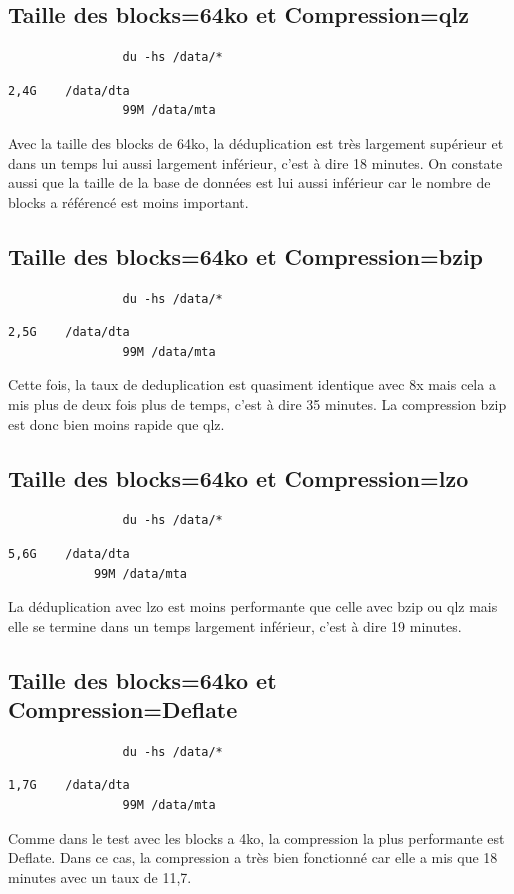 \documentclass[a4paper]{report}
\begin{document}
		\subsection{Taille des blocks=64ko et Compression=qlz}
			\begin{lstlisting}
				du -hs /data/*
			\end{lstlisting}
			\begin{lstlisting}[backgroundcolor=\color{yellow}]
				2,4G	/data/dta
				99M	/data/mta
			\end{lstlisting}
				Avec la taille des blocks de 64ko, la déduplication est très largement supérieur et dans un temps lui aussi largement inférieur, c'est à dire 18 minutes. On constate aussi que la taille de la base de données est lui aussi inférieur car le nombre de blocks a référencé est moins important.
		\subsection{Taille des blocks=64ko et Compression=bzip}
			\begin{lstlisting}
				du -hs /data/*
			\end{lstlisting}
			\begin{lstlisting}[backgroundcolor=\color{yellow}]
				2,5G	/data/dta
				99M	/data/mta
			\end{lstlisting}
			Cette fois, la taux de deduplication est quasiment identique avec 8x mais cela a mis plus de deux fois plus de temps, c'est à dire 35 minutes. La compression bzip est donc bien moins rapide que qlz.
		\subsection{Taille des blocks=64ko et Compression=lzo}
			\begin{lstlisting}
				du -hs /data/*
			\end{lstlisting}
			\begin{lstlisting}[backgroundcolor=\color{yellow}]
			5,6G	/data/dta
			99M	/data/mta
			\end{lstlisting}
				La déduplication avec lzo est moins performante que celle avec bzip ou qlz mais elle se termine dans un temps largement inférieur, c'est à dire 19 minutes.\\
		\subsection{Taille des blocks=64ko et Compression=Deflate}
			\begin{lstlisting}
				du -hs /data/*
			\end{lstlisting}
			\begin{lstlisting}[backgroundcolor=\color{yellow}]
				1,7G	/data/dta
				99M	/data/mta		
			\end{lstlisting}
			Comme dans le test avec les blocks a 4ko, la compression la plus performante est Deflate. Dans ce cas, la compression a très bien fonctionné car elle a mis que 18 minutes avec un taux de 11,7.\\
\end{document}
